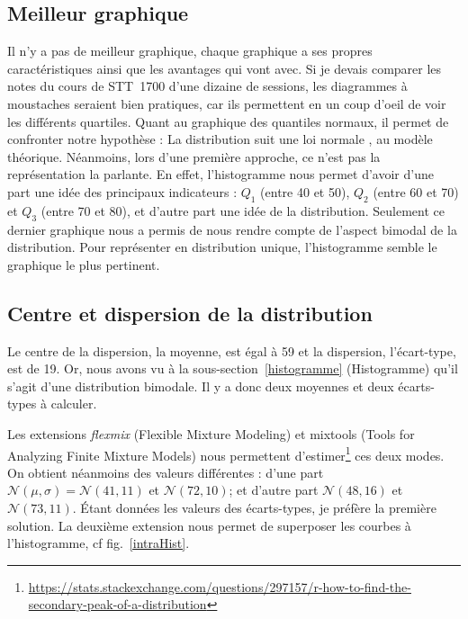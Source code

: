 \documentclass[10pt,twocolumn]{article}
\begin{document}
\subsection{Meilleur graphique}
Il n’y a pas de meilleur graphique, chaque graphique a ses propres caractéristiques ainsi que les avantages qui vont avec. Si je devais comparer les notes du cours de STT~1700 d’une dizaine de sessions, les diagrammes à moustaches seraient bien pratiques, car ils permettent en un coup d’oeil de voir les différents quartiles. Quant au graphique des quantiles normaux, il permet de confronter notre hypothèse : \og La distribution suit une loi normale \fg{}, au modèle théorique. Néanmoins, lors d’une première approche, ce n’est pas la représentation la parlante. En effet, l’histogramme nous permet d’avoir d’une part une idée des principaux indicateurs : $Q_{1}$ (entre 40 et 50), $Q_{2}$ (entre 60 et 70) et $Q_{3}$ (entre 70 et 80), et d’autre part une idée de la distribution. Seulement ce dernier graphique nous a permis de nous rendre compte de l’aspect bimodal de la distribution. Pour représenter en distribution unique, l’histogramme semble le graphique le plus pertinent.


\subsection{Centre et dispersion de la distribution}
Le centre de la dispersion, la moyenne, est égal à 59 et la dispersion, l’écart-type, est de 19. Or, nous avons vu à la sous-section~\ref{histogramme} (Histogramme) qu’il s’agit d’une distribution bimodale. Il y a donc deux moyennes et deux écarts-types à calculer.

Les extensions \textit{flexmix} (Flexible Mixture Modeling) et mixtools (Tools for Analyzing Finite Mixture Models) nous permettent d’estimer\footnote{\url{https://stats.stackexchange.com/questions/297157/r-how-to-find-the-secondary-peak-of-a-distribution}} ces deux modes. On obtient néanmoins des valeurs différentes : d’une part $\mathcal{N}(\mu,\sigma) = \mathcal{N}(41,11)$ et $\mathcal{N}(72,10)$; et d’autre part $\mathcal{N}(48,16)$ et $\mathcal{N}(73,11)$. Étant données les valeurs des écarts-types, je préfère la première solution. La deuxième extension nous permet de superposer les courbes à l’histogramme, cf fig.~\ref{intraHist}.
\end{document}
